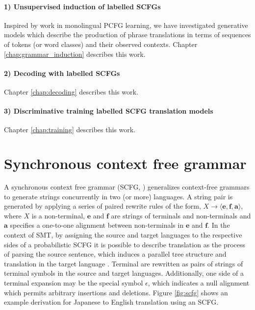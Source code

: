 \paragraph{1) Unsupervised induction of labelled SCFGs}
Inspired by work in monolingual PCFG learning, we have investigated generative models which describe the production of phrase translations in terms of sequences of tokens (or word classes) and their observed contexts.
Chapter \ref{chap:grammar_induction} describes this work.

\paragraph{2) Decoding with labelled SCFGs}
Chapter \ref{chap:decoding} describes this work.

\paragraph{3) Discriminative training labelled SCFG translation models}
Chapter \ref{chap:training} describes this work.


\section{Synchronous context free grammar} \label{sec:scfg}

A synchronous context free grammar (SCFG, \cite{lewis68scfg}) generalizes context-free grammars to generate strings concurrently in two (or more) languages. A string pair is generated by applying a series of paired rewrite rules of the form, $X \rightarrow \langle \mathbf{e}, \mathbf{f}, \mathbf{a} \rangle$, where $X$ is a non-terminal, $\mathbf{e}$ and $\mathbf{f}$ are strings of terminals and non-terminals and $\mathbf{a}$ specifies a one-to-one alignment between non-terminals in $\mathbf{e}$ and $\mathbf{f}$.
In the context of SMT, by assigning the source and target languages to the respective sides of a probabilistic SCFG it is possible to describe translation as the process of parsing the source sentence, which induces a parallel tree structure and translation in the target language \cite{chiang07hierarchical}.  
Terminal are rewritten as pairs of strings of terminal symbols in the source and target languages.  Additionally, one side of a terminal expansion may be the special symbol $\epsilon$, which indicates a null alignment which permits arbitrary insertions and deletions.
Figure \ref{fig:scfg} shows an example derivation for Japanese to English translation using an SCFG.

